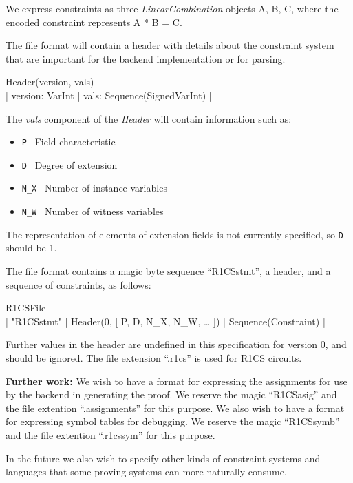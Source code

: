 We express constraints as three \emph{LinearCombination} objects A, B, C, where the encoded constraint represents A * B = C.

The file format will contain a header with details about the constraint system that are important for the backend implementation or for parsing.

{\ttfamily
Header(version, vals) \shortleftarrow\\
| version: VarInt | vals: Sequence(SignedVarInt) |
}

The \emph{vals} component of the \emph{Header} will contain information such as:
\begin{itemize}
  \item  {\tt P} \shortleftarrow\ Field characteristic
  \item  {\tt D} \shortleftarrow\ Degree of extension
  \item  {\tt N\_X} \shortleftarrow\ Number of instance variables
  \item  {\tt N\_W} \shortleftarrow\ Number of witness variables
\end{itemize}

The representation of elements of extension fields is not currently specified, so {\tt D} should be 1.

The file format contains a magic byte sequence  “R1CSstmt”, a header, and a sequence of constraints, as follows:

{\ttfamily
R1CSFile \shortleftarrow\\
| "R1CSstmt" | Header(0, [ P, D, N\_X, N\_W, … ]) | Sequence(Constraint) |
}

Further values in the header are undefined in this specification for version 0, and should be ignored. The file extension “.r1cs” is used for R1CS circuits.

\textbf{Further work:} We wish to have a format for expressing the assignments for use by the backend in generating the proof. We reserve the magic “R1CSasig” and the file extention “.assignments” for this purpose. We also wish to have a format for expressing symbol tables for debugging. We reserve the magic “R1CSsymb” and the file extention “.r1cssym” for this purpose.

In the future we also wish to specify other kinds of constraint systems and languages that some proving systems can more naturally consume.

